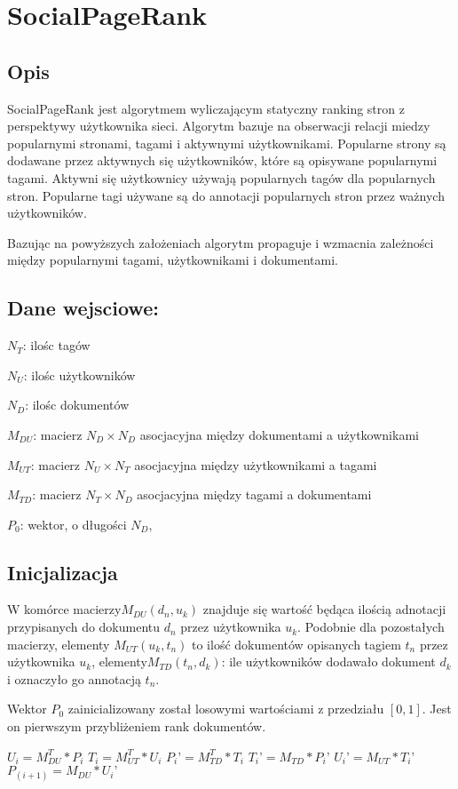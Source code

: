 \section{SocialPageRank}
\subsection{Opis}
SocialPageRank jest algorytmem wyliczającym statyczny ranking stron z perspektywy użytkownika sieci. Algorytm bazuje na obserwacji relacji miedzy popularnymi stronami, tagami i aktywnymi użytkownikami. Popularne strony są dodawane przez aktywnych się użytkowników, które są opisywane popularnymi tagami. Aktywni się użytkownicy używają popularnych tagów dla popularnych stron. Popularne tagi używane są do annotacji popularnych stron przez ważnych użytkowników.

Bazując na powyższych założeniach algorytm propaguje i wzmacnia zależności między popularnymi tagami, użytkownikami i dokumentami. 
\subsection*{Dane wejsciowe:}
$N_T$: ilośc tagów

$N_U$: ilośc użytkowników

$N_D$: ilośc dokumentów

$M_{DU}$: macierz $N_D \times N_D$ asocjacyjna między dokumentami a użytkownikami

$M_{UT}$: macierz $N_U \times N_T$  asocjacyjna między użytkownikami a tagami

$M_{TD}$: macierz $N_T \times N_D$ asocjacyjna między tagami a dokumentami

$P_0$: wektor, o długości $N_D$, 

\subsection*{Inicjalizacja}
W komórce macierzy$M_{DU}(d_n, u_k)$ znajduje się wartość będąca ilością adnotacji przypisanych do dokumentu $d_n$ przez użytkownika $u_k$. Podobnie dla pozostałych macierzy, elementy $M_{UT}(u_k, t_n)$ to ilość dokumentów opisanych tagiem $t_n$ przez użytkownika $u_k$, elementy$M_{TD}(t_n, d_k)$: ile użytkowników dodawało dokument $d_k$ i oznaczyło go annotacją $t_n$. 

Wektor $P_0$ zainicializowany został losowymi wartościami z przedziału $[0,1]$. Jest on pierwszym przybliżeniem rank dokumentów.


\begin{algorithmic}
\REPEAT
\STATE $U_i = M_{DU}^T * P_i$
\STATE $T_i = M_{UT}^T * U_i$
\STATE $P_i’ = M_{TD}^T * T_i$
\STATE $T_i’ = M_{TD}  * P_i’$
\STATE $U_i’ = M_{UT} * T_i’$
\STATE $P_(i+1) = M_{DU} * U_i’$

\end{algorithmic}

